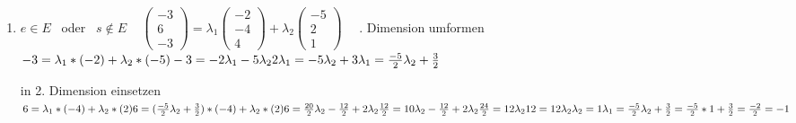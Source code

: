 \documentclass[10pt,ngerman]{scrartcl}
\begin{document}
\begin{enumerate}[1.]
\begin{enumerate}[(a)]
\begin{enumerate}
	\item \begin{math}e \in E\end{math} ~oder~ \begin{math}s \notin E \end{math}\newline
	 ~\newline
	\begin{math}\begin{pmatrix}-3 \\ 6 \\ -3\end{pmatrix} = \lambda _1 \begin{pmatrix}-2 \\ -4 \\ 4\end{pmatrix} + \lambda _2\begin{pmatrix}-5 \\ 2 \\ 1\end{pmatrix} \end{math}\newline
	 ~\newline~. Dimension umformen\newline
	\begin{math}
	-3 = \lambda _1 * (-2) + \lambda _2 * (-5) \newline
	-3 = -2 \lambda _1  - 5 \lambda _2 \newline
	2 \lambda _1 = -5 \lambda _2 + 3 \newline
	\lambda _1 = \frac{-5}{2} \lambda _2 + \frac{3}{2}
	\end{math}
	
	in 2. Dimension einsetzen \newline
	\begin{math}
	6 = \lambda _1 * (-4) + \lambda _2 * (2) \newline
	6 = (\frac{-5}{2} \lambda _2 + \frac{3}{2}) * (-4) + \lambda _2 * (2) \newline
	6 = \frac{20}{2} \lambda _2 - \frac{12}{2} + 2\lambda _2  \newline
	\frac{12}{2} = 10 \lambda _2 - \frac{12}{2} + 2\lambda _2  \newline
	\frac{24}{2} = 12 \lambda _2 \newline
	12 = 12 \lambda _2 \newline
	\lambda _2 = 1\newline
	\lambda _1 = \frac{-5}{2} \lambda _2 + \frac{3}{2} = \frac{-5}{2} * 1 + \frac{3}{2} = \frac{-2}{2} = -1
	\end{math}
	

\end{enumerate}
\end{enumerate}
\end{enumerate}
\end{document}
